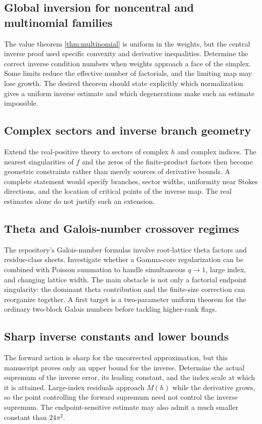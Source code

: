 \documentclass[11pt,a4paper]{article}
\numberwithin{equation}{section}
\theoremstyle{definition}
\begin{document}
\subsection{Global inversion for noncentral and multinomial families}
The value theorem \cref{thm:multinomial} is uniform in the weights, but the central inverse proof used specific convexity and derivative inequalities. Determine the correct inverse condition numbers when weights approach a face of the simplex. Some limits reduce the effective number of factorials, and the limiting map may lose growth. The desired theorem should state explicitly which normalization gives a uniform inverse estimate and which degenerations make such an estimate impossible.

\subsection{Complex sectors and inverse branch geometry}
Extend the real-positive theory to sectors of complex $h$ and complex indices. The nearest singularities of $f$ and the zeros of the finite-product factors then become geometric constraints rather than merely sources of derivative bounds. A complete statement would specify branches, sector widths, uniformity near Stokes directions, and the location of critical points of the inverse map. The real estimates alone do not justify such an extension.

\subsection{Theta and Galois-number crossover regimes}
The repository's Galois-number formulas involve root-lattice theta factors and residue-class sheets. Investigate whether a Gamma-core regularization can be combined with Poisson summation to handle simultaneous $q\to1$, large index, and changing lattice width. The main obstacle is not only a factorial endpoint singularity: the dominant theta contribution and the finite-size correction can reorganize together. A first target is a two-parameter uniform theorem for the ordinary two-block Galois numbers before tackling higher-rank flags.

\subsection{Sharp inverse constants and lower bounds}
The forward action is sharp for the uncorrected approximation, but this manuscript proves only an upper bound for the inverse. Determine the actual supremum of the inverse error, its leading constant, and the index scale at which it is attained. Large-index residuals approach $M(h)$ while the derivative grows, so the point controlling the forward supremum need not control the inverse supremum. The endpoint-sensitive estimate may also admit a much smaller constant than $24\pi^2$.
\end{document}
